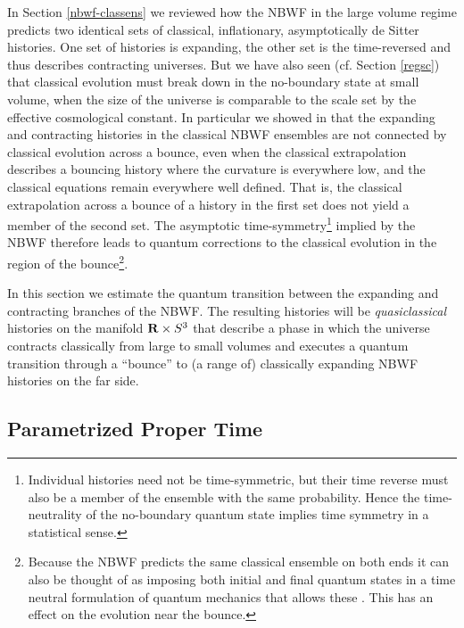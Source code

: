 \documentclass[prd,floats,superscriptaddress,eqsecnum,floatfix,nofootinbib,12pt]{revtex4}
\begin{document}
{{{{{ In Section \ref{nbwf-classens} we reviewed how the NBWF in the large volume regime predicts two identical sets of classical, inflationary, asymptotically de Sitter histories. One set of histories is expanding, the other set is the time-reversed and thus describes contracting universes. But we have also seen (cf. Section \ref{regsc}) that classical evolution must break down in the no-boundary state at small volume, when the size of the universe is comparable to the scale set by the effective cosmological constant. In particular we showed in \cite{HHH08a} that the expanding and contracting histories in the classical NBWF ensembles are not connected by classical evolution across a bounce, even when the classical extrapolation describes a bouncing history where the curvature is everywhere low, and the classical equations remain everywhere well defined. That is, the classical extrapolation across a bounce of a history in the first set does not yield a member of the second set. The asymptotic time-symmetry\footnote{Individual histories need not be time-symmetric, but their time reverse must also be a member of the ensemble with the same probability. Hence the time-neutrality of the no-boundary quantum state implies time symmetry in a statistical sense.} implied by the NBWF therefore leads to quantum corrections to the classical evolution in the region of the bounce\footnote{Because the NBWF predicts the same classical ensemble on both ends it can also be thought of as imposing both initial and final quantum states in a time neutral formulation of quantum mechanics that allows these \cite{GH93b,HHXX,Har95c}. This has an effect on the evolution near the bounce.}.

In this section we estimate the quantum transition between the expanding and contracting branches of the NBWF. The resulting histories will be {\it quasiclassical} histories on the manifold ${\bf R}\times S^3$ that describe a phase in which the universe contracts classically from large to small volumes and executes a quantum transition through a ``bounce'' to (a range of) classically expanding NBWF histories on the far side.}

\subsection{Parametrized Proper Time}
\label{paramtime} 


}}}}
\end{document}
